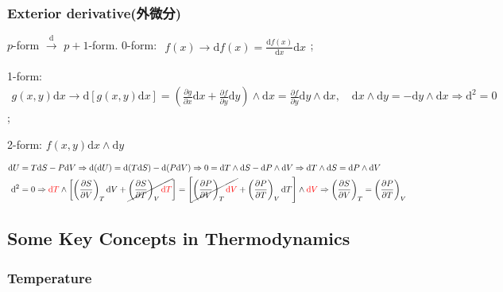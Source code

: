 \documentclass[../../main.tex]{subfiles}
\begin{document}
\subsubsection{Exterior derivative(外微分)}
$p$-form $\stackrel{\mathrm{d}}{\rightarrow}$ $p+1$-form.
0-form: $\begin{aligned}
        f(x)\rightarrow \mathrm{d}f(x) = \frac{\mathrm{d}f(x)}{\mathrm{d}x}\mathrm{d}x
    \end{aligned}$;
    
1-form: $\begin{aligned}
        g(x,y)\mathrm{d}x\rightarrow \mathrm{d}[g(x,y)\mathrm{d}x] = \left(\frac{\partial g}{\partial x}\mathrm{d}x + \frac{\partial f}{\partial y}\mathrm{d}y\right)\wedge \mathrm{d}x = \frac{\partial f}{\partial y}\mathrm{d}y\wedge\mathrm{d}x,\quad\mathrm{d}x\wedge\mathrm{d}y = -\mathrm{d}y\wedge\mathrm{d}x\Rightarrow \mathrm{d}^{2} = 0
    \end{aligned}$;

2-form: $f(x,y)\mathrm{d}x\wedge\mathrm{d}y$

$\begin{aligned}
    \mathrm{d}U &= T\mathrm{d}S - P\mathrm{d}V\Rightarrow
    \mathrm{d}(\mathrm{d}U)  = \mathrm{d}(T\mathrm{d}S) - \mathrm{d}(P\mathrm{d}V)
    \Rightarrow 0 = \mathrm{d}T\wedge\mathrm{d}S - \mathrm{d}P \wedge \mathrm{d}V\Rightarrow
    \mathrm{d}T\wedge\mathrm{d}S = \mathrm{d}P\wedge\mathrm{d}V\\
    \mathrm{d}^{2}&=0\Rightarrow{\color{red}{\mathrm{d}T}}\wedge\left[\left(\frac{\partial S}{\partial V}\right)_{T}\mathrm{d}V + \cancel{\left(\frac{\partial S}{\partial T}\right)_{V}{\color{red}{\mathrm{d}T}}}\right] = \left[\cancel{\left(\frac{\partial P}{\partial V}\right)_{T}{\color{red}{\mathrm{d}V}}} + \left(\frac{\partial P}{\partial T}\right)_{V}\mathrm{d}T\right]\wedge{\color{red}{\mathrm{d}V}}\Rightarrow\left(\frac{\partial S}{\partial V}\right)_{T} = \left(\frac{\partial P}{\partial T}\right)_{V}
\end{aligned}$

\subsection{Some Key Concepts in Thermodynamics}

\subsubsection{Temperature}
\end{document}
